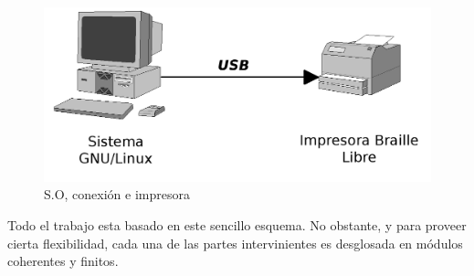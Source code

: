 \begin{figure}[htp]
\centering
\includegraphics[width=13cm]{./img/pc_usb_printer.png}
\caption{S.O, conexi\'on e impresora}
\label{fig:pc_usb_printer}
\end{figure}

Todo el trabajo esta basado en este sencillo esquema. No obstante, y para
proveer cierta flexibilidad, cada una de las partes intervinientes es
desglosada en m\'odulos coherentes y finitos.